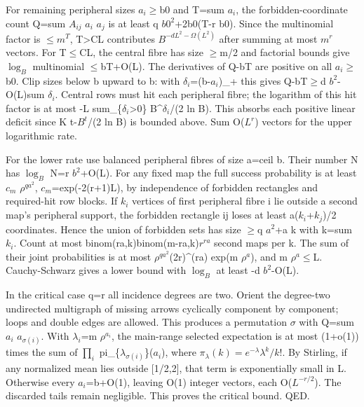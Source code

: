 \documentclass[11pt]{article}
\begin{document}
For remaining peripheral sizes $a_{i}$\ensuremath{\geq}b0 and T=sum $a_{i}$, the forbidden-coordinate count Q=sum $A_{ij}$ $a_{i}$ $a_{j}$ is at least q $b0^{2}$+2b0(T-r b0). Since the multinomial factor is \ensuremath{\leq}$m^{T}$, T>CL contributes $B^{-dL^2-\Omega(L^2)}$ after summing at most $m^{r}$ vectors. For T\ensuremath{\leq}CL, the central fibre has size \ensuremath{\geq}m/2 and factorial bounds give $\log_B$ multinomial \ensuremath{\leq}bT+O(L). The derivatives of Q-bT are positive on all $a_{i}$\ensuremath{\geq}b0. Clip sizes below b upward to b: with $\delta_{i}$=(b-$a_{i}$)\_+ this gives Q-bT\ensuremath{\geq}d $b^{2}$-O(L)sum $\delta_{i}$. Central rows must hit each peripheral fibre; the logarithm of this hit factor is at most -L sum\_\{$\delta_{i}$>0\} B\textasciicircum{}$\delta_{i}$/(2 ln B). This absorbs each positive linear deficit since K t-$B^{t}$/(2 ln B) is bounded above. Sum O($L^{r}$) vectors for the upper logarithmic rate.

For the lower rate use balanced peripheral fibres of size a=ceil b. Their number N has $\log_B$ N=r $b^{2}$+O(L). For any fixed map the full success probability is at least $c_{m}$ $\rho^{qa^2}$, $c_{m}$=exp(-2(r+1)L), by independence of forbidden rectangles and required-hit row blocks. If $k_{i}$ vertices of first peripheral fibre i lie outside a second map's peripheral support, the forbidden rectangle ij loses at least a($k_{i}$+$k_{j}$)/2 coordinates. Hence the union of forbidden sets has size \ensuremath{\geq}q $a^{2}$+a k with k=sum $k_{i}$. Count at most binom(ra,k)binom(m-ra,k)$r^{ra}$ second maps per k. The sum of their joint probabilities is at most $\rho^{qa^2}$(2r)\textasciicircum{}(ra) exp(m $\rho^{a}$), and m $\rho^{a}$\ensuremath{\leq}L. Cauchy-Schwarz gives a lower bound with $\log_B$ at least -d $b^{2}$-O(L).

In the critical case q=r all incidence degrees are two. Orient the degree-two undirected multigraph of missing arrows cyclically component by component; loops and double edges are allowed. This produces a permutation $\sigma$ with Q=sum $a_{i}$ $a_{\sigma(i)}$. With $\lambda_{i}$=m $\rho^{a_i}$, the main-range selected expectation is at most (1+o(1)) times the sum of $\prod_i$ pi\_\{$\lambda_{\sigma(i)}$\}($a_{i}$), where $\pi_\lambda(k)=e^{-\lambda}\lambda^k/k!$. By Stirling, if any normalized mean lies outside [1/2,2], that term is exponentially small in L. Otherwise every $a_{i}$=b+O(1), leaving O(1) integer vectors, each O($L^{-r/2}$). The discarded tails remain negligible. This proves the critical bound. QED.
\end{document}
